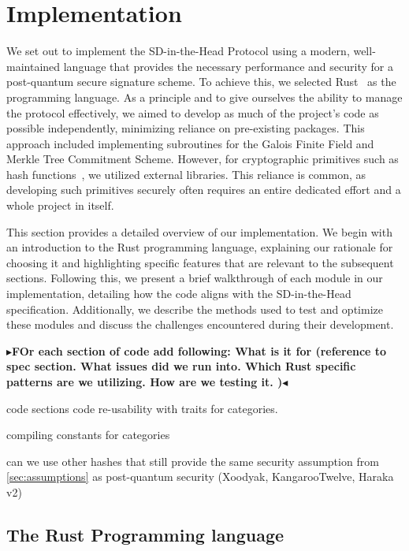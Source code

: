 \documentclass[twoside,11pt]{report}
\theoremstyle{definition}
\theoremstyle{plain}
\newcommand{\todo}[1]{{\color[rgb]{.5,0,0}\textbf{$\blacktriangleright$#1$\blacktriangleleft$}}}
\begin{document}

\chapter{Implementation}\label{ch:impl}

We set out to implement the SD-in-the-Head Protocol using a modern, well-maintained language that provides the necessary performance and security for a post-quantum secure signature scheme. To achieve this, we selected Rust~\cite{rustlangRustProgramming,nistsaferlanguages,lurklurkEffectiveRust,rustlangPerformanceBook} as the programming language. As a principle and to give ourselves the ability to manage the protocol effectively, we aimed to develop as much of the project's code as possible independently, minimizing reliance on pre-existing packages. This approach included implementing subroutines for the Galois Finite Field and Merkle Tree Commitment Scheme. However, for cryptographic primitives such as hash functions~\cite{blakethree,tinykeccak}, we utilized external libraries. This reliance is common, as developing such primitives securely often requires an entire dedicated effort and a whole project in itself.

This section provides a detailed overview of our implementation. We begin with an introduction to the Rust programming language, explaining our rationale for choosing it and highlighting specific features that are relevant to the subsequent sections. Following this, we present a brief walkthrough of each module in our implementation, detailing how the code aligns with the SD-in-the-Head specification. Additionally, we describe the methods used to test and optimize these modules and discuss the challenges encountered during their development.

\todo{FOr each section of code add following: What is it for (reference to spec section. What issues did we run into. Which Rust specific patterns are we utilizing. How are we testing it. )}

code sections
code re-usability with traits for categories.

compiling constants for categories

can we use other hashes that still provide the same security assumption from \autoref{sec:assumptions} as post-quantum security (Xoodyak, KangarooTwelve, Haraka v2)


\section{The Rust Programming language}
\end{document}
